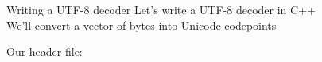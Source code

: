 \documentclass[../index.tex]{subfiles}
\begin{document}
\renewcommand{\currenttitle}{Writing a UTF-8 decoder}
\newcommand{\decoderheaderlisting}[2]{%
}
\begin{frame}{\currenttitle}
%
%
%
%
%
  Let's write a UTF-8 decoder in C++ \\

  We'll convert a vector of bytes into Unicode codepoints \\

  \vspace*{2em}

  Our header file:
  \vspace*{1em}

  \decoderheaderlisting{4}{7}
\end{frame}
\end{document}
